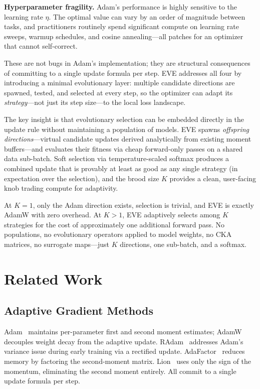 \documentclass[12pt]{article}
\begin{document}
\textbf{Hyperparameter fragility.}
Adam's performance is highly sensitive to the learning rate $\eta$.
The optimal value can vary by an order of magnitude between tasks,
and practitioners routinely spend significant compute on learning rate
sweeps, warmup schedules, and cosine annealing---all patches for an
optimizer that cannot self-correct.

\medskip

These are not bugs in Adam's implementation; they are structural
consequences of committing to a single update formula per step.
EVE addresses all four by introducing a minimal evolutionary layer:
multiple candidate directions are spawned, tested, and selected at
every step, so the optimizer can adapt its \emph{strategy}---not just
its step size---to the local loss landscape.

The key insight is that evolutionary selection can be embedded directly
in the update rule without maintaining a population of models.
EVE spawns \emph{offspring directions}---virtual candidate updates
derived analytically from existing moment buffers---and evaluates their
fitness via cheap forward-only passes on a shared data sub-batch.
Soft selection via temperature-scaled softmax produces a combined
update that is provably at least as good as any single strategy
(in expectation over the selection), and the brood size $K$ provides
a clean, user-facing knob trading compute for adaptivity.

At $K = 1$, only the Adam direction exists, selection is trivial, and
EVE is exactly AdamW with zero overhead.
At $K > 1$, EVE adaptively selects among $K$ strategies for the cost
of approximately one additional forward pass.
No populations, no evolutionary operators applied to model weights,
no CKA matrices, no surrogate maps---just $K$ directions, one sub-batch,
and a softmax.


\section{Related Work}
\label{sec:related}

\subsection{Adaptive Gradient Methods}

Adam~\cite{kingma2015adam} maintains per-parameter first and second
moment estimates; AdamW~\cite{loshchilov2019decoupled} decouples weight
decay from the adaptive update.
RAdam~\cite{liu2020radam} addresses Adam's variance issue during early
training via a rectified update.
AdaFactor~\cite{shazeer2018adafactor} reduces memory by factoring the
second-moment matrix.
Lion~\cite{chen2024lion} uses only the sign of the momentum, eliminating
the second moment entirely.
All commit to a single update formula per step.
\end{document}
